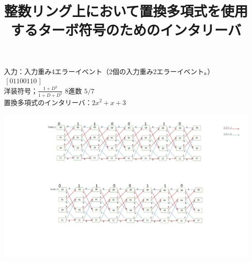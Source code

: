 \documentclass[24 pts]{article}
\title{整数リング上において置換多項式を使用するターボ符号のためのインタリーバ}
\date{}
\begin{document}
\maketitle

入力：入力重み4エラーイベント（2個の入力重み2エラーイベント。）$\,[0 1 1 0 0 1 1 0\,]$\\
洋装符号；$\frac{1+D^2}{1+D+D^2 }$  8進数 $5/7$\\
置換多項式のインタリーバ：$2x^2+x+3$


\includegraphics[scale =0.4]{Trellis}\\
\end{document}
